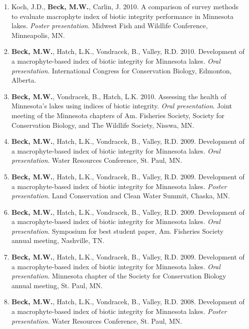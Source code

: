 \documentclass[letterpaper,12pt]{article}
\begin{document}
\begin{enumerate}
\item Koch, J.D., {\bf Beck, M.W.}, Carlin, J. 2010. A comparison of survey methods to evaluate macrophyte index of biotic integrity performance in Minnesota lakes. \textit{Poster presentation}. Midwest Fish and Wildlife Conference, Minneapolis, MN.

\item {\bf Beck, M.W.}, Hatch, L.K., Vondracek, B., Valley, R.D. 2010. Development of a macrophyte-based index of biotic integrity for Minnesota lakes. \textit{Oral presentation}. International Congress for Conservation Biology, Edmonton, Alberta.

\item {\bf Beck, M.W.}, Vondracek, B., Hatch, L.K. 2010. Assessing the health of Minnesota's lakes using indices of biotic integrity. \textit{Oral presentation}. Joint meeting of the Minnesota chapters of Am. Fisheries Society, Society for Conservation Biology, and The Wildlife Society, Nisswa, MN.

\item {\bf Beck, M.W.}, Hatch, L.K., Vondracek, B., Valley, R.D. 2009. Development of a macrophyte-based index of biotic integrity for Minnesota lakes. \textit{Oral presentation}. Water Resources Conference, St. Paul, MN.

\item {\bf Beck, M.W.}, Hatch, L.K., Vondracek, B., Valley, R.D. 2009. Development of a macrophyte-based index of biotic integrity for Minnesota lakes. \textit{Poster presentation}. Land Conservation and Clean Water Summit, Chaska, MN.

\item {\bf Beck, M.W.}, Hatch, L.K., Vondracek, B., Valley, R.D. 2009. Development of a macrophyte-based index of biotic integrity for Minnesota lakes. \textit{Oral presentation}. Symposium for best student paper, Am. Fisheries Society annual meeting, Nashville, TN.

\item {\bf Beck, M.W.}, Hatch, L.K., Vondracek, B., Valley, R.D. 2009. Development of a macrophyte-based index of biotic integrity for Minnesota lakes. \textit{Oral presentation}. Minnesota chapter of the Society for Conservation Biology annual meeting, St. Paul, MN.

\item {\bf Beck, M.W.}, Hatch, L.K., Vondracek, B., Valley, R.D. 2008. Development of a macrophyte-based index of biotic integrity for Minnesota lakes. \textit{Poster presentation}. Water Resources Conference, St. Paul, MN.


\end{enumerate}
\end{document}
